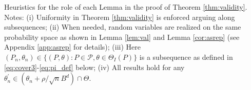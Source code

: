 \documentclass[letterpaper,11pt]{article}
\theoremstyle{myplain}
\theoremstyle{mydefinition}
\theoremstyle{myremark}
\newcommand{\cP}{\mathcal{P}}
\newcommand{\thetnprime}{(\theta_n +\rho /\sqrt{n} B^d)\cap \Theta}
\numberwithin{equation}{section}
\numberwithin{figure}{section}
\begin{document}
\begin{appendices}
\begin{figure}[h]
\begin{center}
\end{center}
\end{figure}

\begin{table}[!htbp]
\advance\leftskip-1.5cm
\parbox{20cm}{\caption[Table Flow]{Heuristics for the role of each Lemma in the proof of Theorem \ref{thm:validity}. Notes: (i) Uniformity in Theorem \ref{thm:validity} is enforced arguing along subsequences; (ii) When needed, random variables are realized on the same probability space as shown in Lemma \ref{lem:val} and Lemma \ref{cor:asrep} (see Appendix \ref{app:asrep} for details); (iii) Here $(P_n,\theta_n)\in \{(P,\theta):P \in \cP,\theta \in \Theta_I(P)\}$ is a subsequence as defined in \eqref{eq:cover3}-\eqref{eq:pi_def} below; (iv) All results hold for any $\theta_n^\prime \in \thetnprime$.}\label{table:flow}} \smallskip





\end{table}
\end{appendices}
\end{document}

